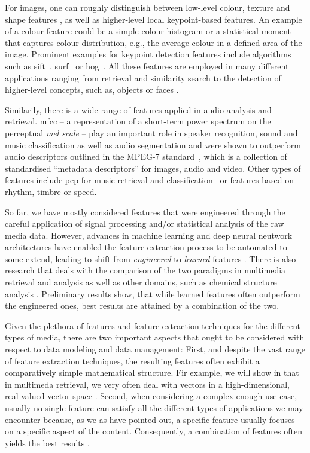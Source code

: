 For images, one can roughly distinguish between low-level colour, texture and shape features \cite{Salau:2019Feature}, as well as higher-level local keypoint-based features. An example of a colour feature could be a simple colour histogram or a statistical moment that captures colour distribution, e.g., the average colour in a defined area of the image. Prominent examples for keypoint detection features include algorithms such as \acrfull{sift}~\cite{Lowe:1999object}, \acrfull{surf}~\cite{Bay:2006surf} or \acrfull{hog}~\cite{Dalal:2005Histograms}. All these features are employed in many different applications ranging from retrieval and similarity search to the detection of higher-level concepts, such as, objects or faces \cite{Deniz:2011Face, Farooq:2016Object}.

Similarily, there is a wide range of features applied in audio analysis and retrieval. \acrfull{mfcc} -- a representation of a short-term power spectrum on the perceptual \emph{mel scale} -- play an important role in speaker recognition, sound and music classification as well as audio segmentation \cite{Kim:2010Comparison} and were shown to outperform audio descriptors outlined in the MPEG-7 standard~\cite{Quackenbush:2001Overview}, which is a collection of standardised ``metadata descriptors'' for images, audio and video. Other types of features include \acrfull{pcp} for music retrieval and classification~\cite{Lee:2006Automatic,Demirel:2019Automatic} or features based on rhythm, timbre or speed.

So far, we have mostly considered features that were engineered through the careful application of signal processing and/or statistical analysis of the raw media data. However, advances in machine learning and deep neural neutwork architectures have enabled the feature extraction process to be automated to some extend, leading to shift from  \emph{engineered} to \emph{learned} features \cite{Hamel:2010Learning,Gordo:2016Deep}. There is also research that deals with the comparison of the two paradigms in multimedia retrieval and analysis \cite{Budnik:2017learned} as well as other domains, such as chemical structure analysis \cite{Gallegos:2021importance}. Preliminary results show, that while learned features often outperform the engineered ones, best results are attained by a combination of the two.

Given the plethora of features and feature extraction techniques for the different types of media, there are two important aspects that ought to be considered with respect to data modeling and data management: First, and despite the vast range of feature extraction techniques, the resulting features often exhibit a comparatively simple mathematical structure. Fir example, we will show in  that in multimeda retrieval, we very often deal with vectors in a high-dimensional, real-valued vector space \cite{Zezula:2006similarity}. Second, when considering a complex enough use-case, usually no single feature can satisfy all the different types of applications we may encounter because, as we as have pointed out, a specific feature usually focuses on a specific aspect of the content. Consequently, a combination of features often yields the best results \cite{Deselaers:2008Features}.

